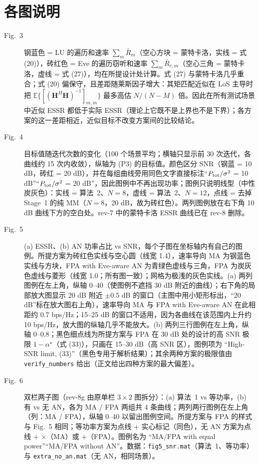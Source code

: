 \documentclass[11pt,a4paper]{ctexart}
\newcommand{\code}[1]{\texttt{#1}}
\newcommand{\E}{\mathbb{E}}
\newcommand{\bH}{\mathbf H}
\begin{document}
\section{各图说明}
\begin{description}
\item[Fig.~3] 钢蓝色 = LU 的遍历和速率 $\sum_m\bar R_m$（空心方块 = 蒙特卡洛，实线 = 式 (20)），砖红色 = Eve 的遍历窃听和速率 $\sum_m\bar R_{e,m}$（空心三角 = 蒙特卡洛，虚线 = 式 (27)），均在所提设计处计算。式 (27) 与蒙特卡洛几乎重合；式 (20) 偏保守，且差距随莱斯因子增大：其矩匹配近似在 LoS 主导时把 $\E\{[(\bH^H\bH)^{-1}]_{m,m}\}$ 最多高估 $N/(N-M)$ 倍。因此在所有测试场景中近似 ESSR 都低于实际 ESSR（理论上它既不是上界也不是下界）；各方案的这一差距相近，近似目标不改变方案间的比较结论。
\item[Fig.~4] 目标值随迭代次数的变化（100 个场景平均；横轴只显示前 30 次迭代，各曲线约 15 次内收敛），纵轴为 (P3) 的目标值。颜色区分 SNR（钢蓝 = 10 dB，砖红 = 20 dB），并在每组曲线旁用同色文字直接标注“$P_{\rm tot}/\sigma^2$ = 10 dB”“$P_{\rm tot}/\sigma^2$ = 20 dB”，因此图例中不再出现功率；图例只说明线型（中性炭灰色）：实线 = 算法~2、$N=8$，虚线 = 算法~2、$N=12$，点线 = 去掉 Stage~1 的纯 MM（$N=8$，20 dB，故为砖红色）。两列图例放在右下角 10 dB 曲线下方的空白处。rev-7 中的蒙特卡洛 ESSR 曲线已在 rev-8 删除。
\item[Fig.~5] (a) ESSR、(b) AN 功率占比 vs SNR，每个子图在坐标轴内有自己的图例。所提方案为砖红色实线与空心圆（线宽 1.4），速率导向 MA 为钢蓝色实线与方块，FPA with Eve-aware AN 为青绿色虚线与三角，FPA 为炭灰色虚线与菱形（线宽 1.0；所有图一致）；网格为极浅的灰色实线。(a) 两列图例在左上角，纵轴 0--40（使图例不遮挡 30 dB 附近的曲线）；右下角的局部放大图显示 20 dB 附近 $\pm0.5$ dB 的窗口（主图中用小矩形标出，“20 dB”标在放大图右上角），速率导向 MA 与 FPA with Eve-aware AN 在此相距约 0.7 bps/Hz；15--25 dB 的窗口不适用，因为各曲线在该范围内上升约 10 bps/Hz，放大图的纵轴几乎不能放大。(b) 两列三行图例在左上角，纵轴 0--0.8；黑色细点线为所提方案与 FPA 在 30 dB 处的设计的高 SNR 极限 $1-\alpha^\star$（式 (33)），只画在 15--30 dB（高 SNR 区），图例项为 “High-SNR limit, (33)”（黑色专用于解析结果）；其余两种方案的极限值由 \code{verify\_numbers} 给出（正文给出四种方案的最大偏差）。
\item[Fig.~6] 双栏两子图（rev-8g 由原单栏 $3\times2$ 图拆分）：(a) 算法~1 vs 等功率，(b) 有 vs 无 AN，各为 MA / FPA 两组共 4 条曲线；两列两行图例在左上角（列：MA / FPA），纵轴 0--40 以留出图例空间。所提方案与 FPA 的样式与 Fig.~5 相同；等功率方案为点线 + 实心标记（同色），无 AN 方案为点线 + $\times$（MA）或 $+$（FPA）。图例名为 “MA/FPA with equal power”“MA/FPA without AN”。数据：\code{fig5\_snr.mat}（算法~1、等功率）与 \code{extra\_no\_an.mat}（无 AN，相同场景）。

\end{description}
\end{document}
